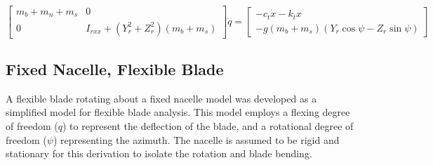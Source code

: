 \documentclass[final,onecolumn]{IEEEtran}
\begin{document}
\begin{equation}
    \begin{bmatrix}
        m_b + m_n + m_s & 0                                             \\
        0               & I_{rxx} + (Y_{r}^{2} + Z_{r}^{2}) (m_b + m_s)
    \end{bmatrix} \ddot{q} =
    \begin{bmatrix}
        - c_{t} \dot{x} - k_{t} x \\
        - g (m_b + m_s) (Y_{r} \cos\psi - Z_{r} \sin\psi)
    \end{bmatrix}
\end{equation}

\subsection{Fixed Nacelle, Flexible Blade}\label{app:fixed_nacelle_flex_blade}
A flexible blade rotating about a fixed nacelle model was developed as a simplified model for flexible blade analysis. This model employs a flexing degree of freedom ($q$) to represent the deflection of the blade, and a rotational degree of freedom ($\psi$) representing the azimuth. The nacelle is assumed to be rigid and stationary for this derivation to isolate the rotation and blade bending.
\end{document}
